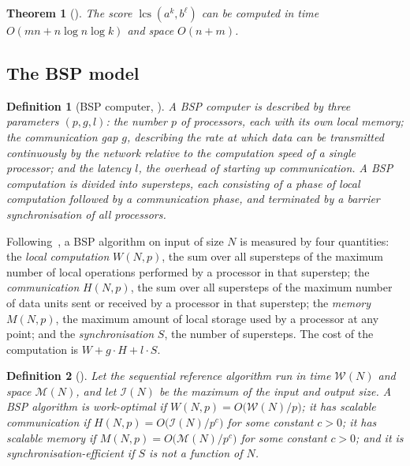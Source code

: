 \documentclass[10pt]{article}
\newtheorem{definition}{Definition}
\newtheorem{theorem}{Theorem}
\newcommand{\lcs}{\operatorname{lcs}}
\begin{document}
\begin{theorem}[{\cite[Corollary 47]{GZT25}}]\label{thm:sequential}
The score $\lcs(a^k,b^\ell)$ can be computed in time
$O(mn+n\log n\log k)$ and space $O(n+m)$.
\end{theorem}

\subsection{The BSP model}\label{sec:bsp}

\begin{definition}[BSP computer, \cite{Valiant90}]
A \emph{BSP computer} is described by three parameters $(p,g,l)$: the number
$p$ of processors, each with its own local memory; the \emph{communication
gap} $g$, describing the rate at which data can be transmitted continuously by
the network relative to the computation speed of a single processor; and the
\emph{latency} $l$, the overhead of starting up communication. A BSP
computation is divided into \emph{supersteps}, each consisting of a phase of
local computation followed by a communication phase, and terminated by a
barrier synchronisation of all processors.
\end{definition}

Following~\cite[Section 2.2]{KruscheThesis}, a BSP algorithm on input of size
$N$ is measured by four quantities: the \emph{local computation}
$W(N,p)$, the sum over all supersteps of the maximum number of local
operations performed by a processor in that superstep; the
\emph{communication} $H(N,p)$, the sum over all supersteps of the maximum
number of data units sent or received by a processor in that superstep; the
\emph{memory} $M(N,p)$, the maximum amount of local storage used by a
processor at any point; and the \emph{synchronisation} $S$, the number of
supersteps. The cost of the computation is $W+g\cdot H+l\cdot S$.

\begin{definition}[{\cite[Definitions 2.3.1, 2.3.3, 2.3.4, 2.3.5]{KruscheThesis}}]
\label{def:scalable}
Let the sequential reference algorithm run in time $\mathcal W(N)$ and space
$\mathcal M(N)$, and let $\mathcal I(N)$ be the maximum of the input and
output size. A BSP algorithm is \emph{work-optimal} if
$W(N,p)=O\bigl(\mathcal W(N)/p\bigr)$; it has \emph{scalable communication}
if $H(N,p)=O\bigl(\mathcal I(N)/p^c\bigr)$ for some constant $c>0$; it has
\emph{scalable memory} if $M(N,p)=O\bigl(\mathcal M(N)/p^c\bigr)$ for some
constant $c>0$; and it is \emph{synchronisation-efficient} if $S$ is not a
function of $N$.
\end{definition}
\end{document}
